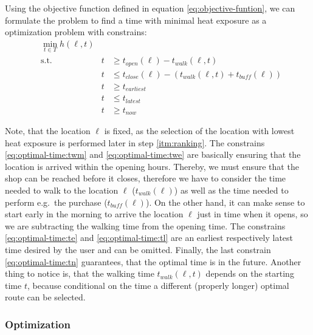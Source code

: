 Using the objective function defined in equation \eqref{eq:objective-funtion}, we can formulate the problem to find a time with minimal heat exposure as a optimization problem with constrains:
\begin{subequations}
	\label{eq:optimal-time}
	\begin{alignat}{2}
	&\min_{t \in T} h(\ell, t) && \label{eq:optimal-time:of} \\
	&\text{s.t.} & t & \geq t_{open}(\ell)-t_{walk}(\ell, t) \label{eq:optimal-time:twm}\\
	&	& t & \leq   t_{close}(\ell)-(t_{walk}(\ell, t)+t_{buff}(\ell))	\label{eq:optimal-time:twe}\\
	&	&  t & \geq t_{earliest} \label{eq:optimal-time:te} \\
	&	&  t & \leq t_{latest} \label{eq:optimal-time:tl} \\
	&  & t  & \geq t_{now} \label{eq:optimal-time:tn} 
	\end{alignat}
\end{subequations}

Note, that the location $\ell$ is fixed, as the selection of the location with lowest heat exposure is performed later in step \ref{itm:ranking}. The constrains \eqref{eq:optimal-time:twm} and \eqref{eq:optimal-time:twe} are  basically ensuring that the location is arrived within the opening hours. Thereby, we must ensure that the shop can be reached before it closes, therefore we have to consider the time needed to walk to the location $\ell$ ($t_{walk}(\ell)$) as well as the time needed to perform e.g.\ the purchase ($t_{buff}(\ell)$). On the other hand, it can make sense to start early in the morning to arrive the location $\ell$ just in time when it opens, so we are subtracting the walking time from the opening time. The constrains \eqref{eq:optimal-time:te} and \eqref{eq:optimal-time:tl} are an earliest respectively latest time desired by the user and can be omitted. Finally, the last constrain  \eqref{eq:optimal-time:tn}  guarantees, that the optimal time is in the future. Another thing to notice is, that the walking time $t_{walk}(\ell, t)$ depends on the starting time $t$, because conditional on the time a different (properly longer) optimal route can be selected.

 \subsubsection{Optimization \label{sec:optimization}}
 
